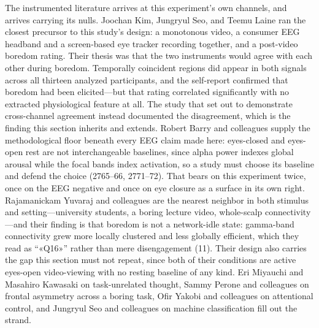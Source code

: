 The instrumented literature arrives at this experiment's own channels, and arrives carrying
its nulls. Joochan Kim, Jungryul Seo, and Teemu Laine ran the closest precursor to this
study's design: a monotonous video, a consumer EEG headband and a screen-based eye tracker
recording together, and a post-video boredom rating. Their thesis was that the two
instruments would agree with each other during boredom. Temporally coincident regions did
appear in both signals across all thirteen analyzed participants, and the self-report
confirmed that boredom had been elicited---but that rating correlated significantly with no
extracted physiological feature at all. The study that set out to demonstrate cross-channel
agreement instead documented the disagreement, which is the finding this section inherits and
extends. Robert Barry and colleagues supply the methodological floor beneath every EEG claim
made here: eyes-closed and eyes-open rest are not interchangeable baselines, since alpha power
indexes global arousal while the focal bands index activation, so a study must choose its
baseline and defend the choice (2765--66, 2771--72). That bears on this experiment twice, once
on the EEG negative and once on eye closure as a surface in its own right. Rajamanickam
Yuvaraj and colleagues are the nearest neighbor in both stimulus and setting---university
students, a boring lecture video, whole-scalp connectivity---and their finding is that boredom
is not a network-idle state: gamma-band connectivity grew more locally clustered and less
globally efficient, which they read as ``«Q16»'' rather than mere disengagement (11). Their
design also carries the gap this section must not repeat, since both of their conditions are
active eyes-open video-viewing with no resting baseline of any kind. Eri Miyauchi and Masahiro
Kawasaki on task-unrelated thought, Sammy Perone and colleagues on frontal asymmetry across a
boring task, Ofir Yakobi and colleagues on attentional control, and Jungryul Seo and colleagues
on machine classification fill out the strand.

